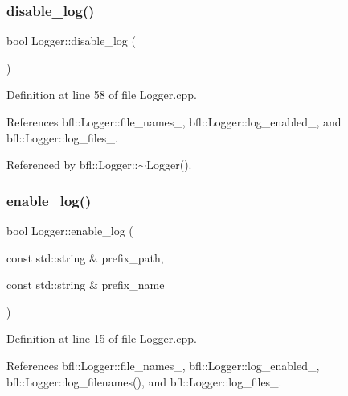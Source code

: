 \subsubsection{\texorpdfstring{disable\+\_\+log()}{disable\_log()}}
{\footnotesize\ttfamily bool Logger\+::disable\+\_\+log (\begin{DoxyParamCaption}{ }\end{DoxyParamCaption})\hspace{0.3cm}{\ttfamily [inherited]}}



Definition at line 58 of file Logger.\+cpp.



References bfl\+::\+Logger\+::file\+\_\+names\+\_\+, bfl\+::\+Logger\+::log\+\_\+enabled\+\_\+, and bfl\+::\+Logger\+::log\+\_\+files\+\_\+.



Referenced by bfl\+::\+Logger\+::$\sim$\+Logger().

\mbox{\label{classbfl_1_1Logger_ae94b97b6e8d7902e8ce048384813122e}} 
\subsubsection{\texorpdfstring{enable\+\_\+log()}{enable\_log()}}
{\footnotesize\ttfamily bool Logger\+::enable\+\_\+log (\begin{DoxyParamCaption}\item[{const std\+::string \&}]{prefix\+\_\+path,  }\item[{const std\+::string \&}]{prefix\+\_\+name }\end{DoxyParamCaption})\hspace{0.3cm}{\ttfamily [inherited]}}



Definition at line 15 of file Logger.\+cpp.



References bfl\+::\+Logger\+::file\+\_\+names\+\_\+, bfl\+::\+Logger\+::log\+\_\+enabled\+\_\+, bfl\+::\+Logger\+::log\+\_\+filenames(), and bfl\+::\+Logger\+::log\+\_\+files\+\_\+.

